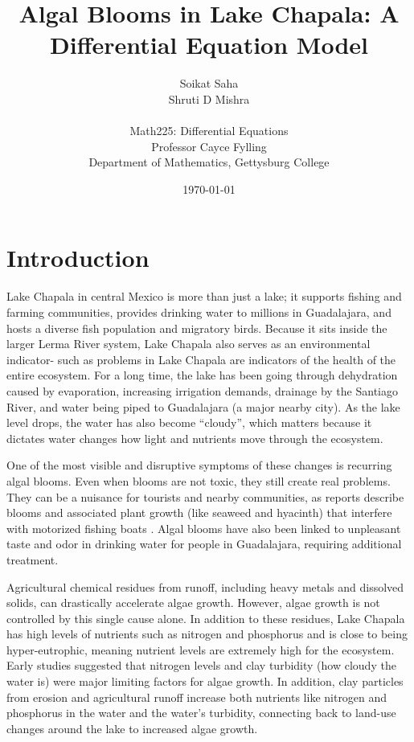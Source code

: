 \documentclass[11pt]{article}
\title{Algal Blooms in Lake Chapala: A Differential Equation Model}
\author{Soikat Saha\\Shruti D Mishra \\ \\
\small Math225: Differential Equations \\
\small Professor Cayce Fylling \\
\small Department of Mathematics, Gettysburg College}
\date{\today}
\begin{document}
\maketitle %

\newpage

\tableofcontents %

\newpage

\section{Introduction}

Lake Chapala in central Mexico is more than just a lake; it supports fishing and farming communities, provides drinking water to millions in Guadalajara, and hosts a diverse fish population and migratory birds. Because it sits inside the larger Lerma River system, Lake Chapala also serves as an environmental indicator- such as problems in Lake Chapala are indicators of the health of the entire ecosystem. For a long time, the lake has been going through dehydration caused by evaporation, increasing irrigation demands, drainage by the Santiago River, and water being piped to Guadalajara (a major nearby city). As the lake level drops, the water has also become ``cloudy'', which matters because it dictates water changes how light and nutrients move through the ecosystem. 

One of the most visible and disruptive symptoms of these changes is recurring algal blooms. Even when blooms are not toxic, they still create real problems. They can be a nuisance for tourists and nearby communities, as reports describe blooms and associated plant growth (like seaweed and hyacinth) that interfere with motorized fishing boats \cite{harwood-algae}. Algal blooms have also been linked to unpleasant taste and odor in drinking water for people in Guadalajara, requiring additional treatment.

Agricultural chemical residues from runoff, including heavy metals and dissolved solids, can drastically accelerate algae growth. However, algae growth is not controlled by this single cause alone. In addition to these residues, Lake Chapala has high levels of nutrients such as nitrogen and phosphorus and is close to being hyper-eutrophic, meaning nutrient levels are extremely high for the ecosystem. Early studies suggested that nitrogen levels and clay turbidity (how cloudy the water is) were major limiting factors for algae growth. In addition, clay particles from erosion and agricultural runoff increase both nutrients like nitrogen and phosphorus in the water and the water’s turbidity, connecting back to land-use changes around the lake to increased algae growth.
\end{document}
